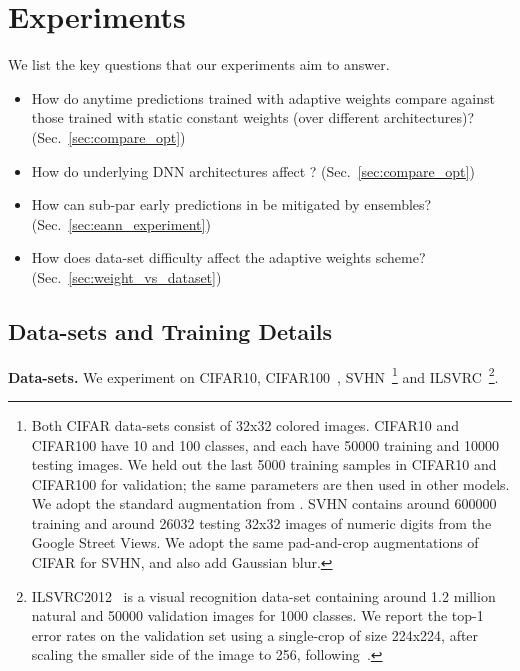 \section{Experiments}
\label{sec:ann_experiment_questions}

We list the key questions that our experiments aim to answer.
\begin{itemize}

\item How do anytime predictions trained with adaptive weights compare against those trained with static constant weights (over different architectures)?
(Sec.~\ref{sec:compare_opt})
\item How do underlying DNN architectures affect \anns? (Sec.~\ref{sec:compare_opt})
\item How can sub-par early predictions in \anns be mitigated by \ann ensembles? 
(Sec.~\ref{sec:eann_experiment})
\item How does data-set difficulty affect the adaptive weights scheme?
(Sec.~\ref{sec:weight_vs_dataset})
\end{itemize}


\subsection{Data-sets and Training Details}
\label{sec:exp}

\textbf{Data-sets.} We experiment on CIFAR10, CIFAR100~\cite{cifar}, SVHN~\cite{svhn}\footnote{Both CIFAR data-sets consist of 32x32 colored images. CIFAR10 and CIFAR100 have 10 and 100 classes, and each have 50000 training and 10000 testing images. We held out the last 5000 training samples in CIFAR10 and CIFAR100 for validation; the same parameters are then used in other models. We adopt the standard augmentation from \cite{supervisednet,resnet}.
SVHN contains around 600000 training and around 26032 testing 32x32 images of numeric digits from the Google Street Views. We adopt the same pad-and-crop augmentations of CIFAR for SVHN, and also add Gaussian blur.}
and ILSVRC~\cite{ILSVRC15}\footnote{
ILSVRC2012~\cite{ILSVRC15} is a visual recognition data-set containing around 1.2 million natural and 50000 validation images for 1000 classes. We report the top-1 error rates on the validation set using a single-crop of size 224x224, after scaling the smaller side of the image to 256, following~\cite{resnet}.}.

